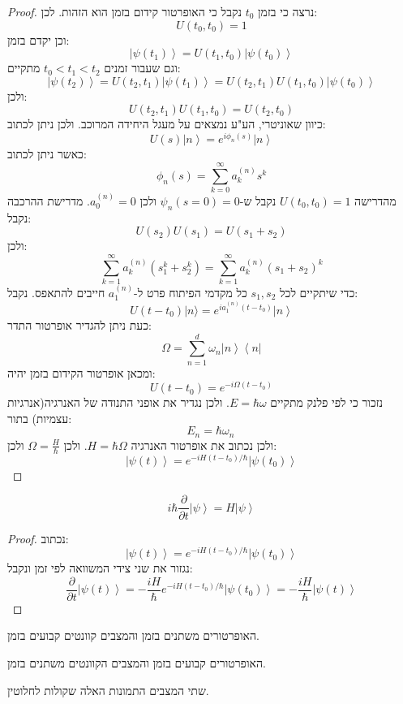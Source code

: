 \documentclass{tstextbook}
\begin{document}
\begin{proof}
נרצה כי בזמן \(t_{0}\) נקבל כי האופרטור קידום בזמן הוא הזהות. לכן:
$$U(t_{0},t_{0})=1$$
וכן יקדם בזמן:
$$\left|\psi\left(t_{1}\right)\right\rangle=U\left(t_{1},t_{0}\right)\left|\psi\left(t_{0}\right)\right\rangle$$
וגם שעבור זמנים \(t_{0}<t_{1}<t_{2}\) מתקיים:
$$\left|\psi\left(t_{2}\right)\right\rangle=U\left(t_{2},t_{1}\right)\left|\psi\left(t_{1}\right)\right\rangle=U\left(t_{2},t_{1}\right)U\left(t_{1},t_{0}\right)\left|\psi\left(t_{0}\right)\right\rangle$$
ולכן:
$$U\left(t_{2},t_{1}\right)U\left(t_{1},t_{0}\right)=U\left(t_{2},t_{0}\right)$$
כיוון שאוניטרי, הע"ע נמצאים על מעגל היחידה המרוכב. ולכן ניתן לכתוב:
$$U\left(s\right)\left|n\right\rangle=e^{i\phi_{n}\left(s\right)}\left|n\right\rangle$$
כאשר ניתן לכתוב:
$$\mathcal{\phi}_{n}\left(s\right)=\sum_{k=0}^{\infty}a_{k}^{\left(n\right)}s^{k}$$
מהדרישה \(U(t_{0},t_{0})=1\) נקבל ש-\(\psi_{n}(s=0)=0\) ולכן \(a_{0}^{(n)}=0\). מדרישת ההרכבה נקבל:
$$U\left(s_{2}\right)U\left(s_{1}\right)=U\left(s_{1}+s_{2}\right)$$
ולכן:
$$\sum_{k=1}^{\infty}a_{k}^{(n)}\left(s_{1}^{k}+s_{2}^{k}\right)=\sum_{k=1}^{\infty}a_{k}^{(n)}\left(s_{1}+s_{2}\right)^{k}$$
כדי שיתקיים לכל \(s_{1},s_{2}\) כל מקדמי הפיתוח פרט ל-\(a_{1}^{(n)}\) חייבים להתאפס. נקבל:
$$U\left(t-t_{0}\right)|n\rangle=e^{i a_{1}^{\left(n\right)}\left(t-t_{0}\right)}\left|n\right\rangle$$
כעת ניתן להגדיר אופרטור התדר:
$$\Omega=\sum_{n=1}^{d}\omega_{n}\left|n\right\rangle\left\langle n\right|$$
ומכאן אופרטור הקידום בזמן יהיה:
$$U\left(t-t_{0}\right)=e^{-i\Omega\left(t-t_{0}\right)}$$
נזכור כי לפי פלנק מתקיים \(E = \hbar \omega\). ולכן נגדיר את אופני התנודה של האנרגיה(אנרגיות עצמיות) בתור:
$$E_{n}=\hbar\omega_{n}\,$$
ולכן נכתוב את אופרטור האנרגיה \(H=\hbar \Omega\). ולכן \(\Omega=\frac{H}{\hbar}\) ולכן:
$$\left|\psi\left(t\right)\right\rangle=e^{-i H\left(t-t_{0}\right)/\hbar}\left|\psi\left(t_{0}\right)\right\rangle$$

\end{proof}
\begin{proposition}
$$i\hbar\frac{\partial}{\partial t}\left|\psi\right\rangle=H\left|\psi\right\rangle$$

\end{proposition}
\begin{proof}
נכתוב:
$$\left|\psi\left(t\right)\right\rangle=e^{-i H\left(t-t_{0}\right)/\hbar}\left|\psi\left(t_{0}\right)\right\rangle$$
נגזור את שני צידי המשוואה לפי זמן ונקבל:
$$\frac{\partial}{\partial t}\left|\psi\left(t\right)\right\rangle=-\frac{i H}{\hbar}e^{-i H\left(t-t_{0}\right)/\hbar}\left|\psi\left(t_{0}\right)\right\rangle=-\frac{i H}{\hbar}\left|\psi\left(t\right)\right\rangle$$

\end{proof}
\begin{definition}
האופרטורים משתנים בזמן והמצבים קוונטים קבועים בזמן.

\end{definition}
\begin{definition}
האופרטורים קבועים בזמן והמצבים הקוונטים משתנים בזמן.

\end{definition}
שתי המצבים התמונות האלה שקולות לחלוטין.
\end{document}
